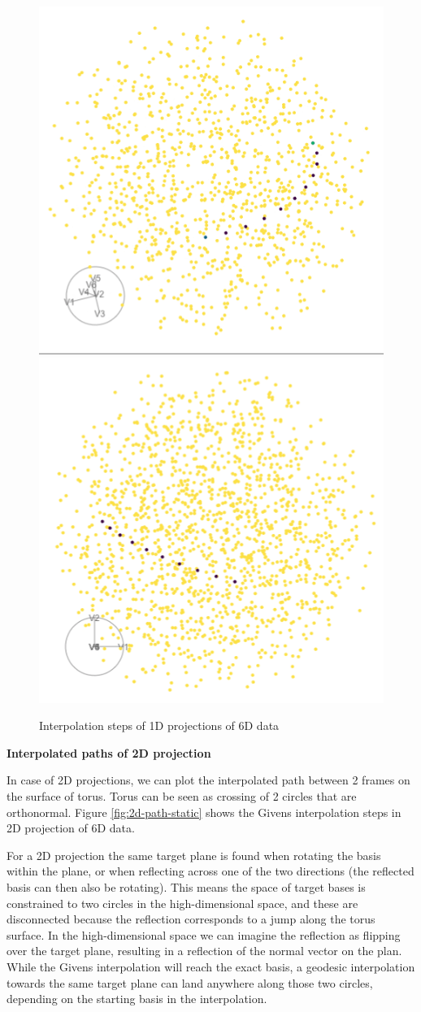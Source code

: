 \begin{Schunk}
\begin{figure}

{\centering \includegraphics[width=0.5\linewidth]{sphere_static} \includegraphics[width=0.5\linewidth]{torus_static} 

}

\caption[Interpolation steps of 1D projections of 6D data]{Interpolation steps of 1D projections of 6D data}\label{fig:1d-path-static}
\end{figure}
\end{Schunk}

\textbf{Interpolated paths of 2D projection}

In case of 2D projections, we can plot the interpolated path between 2
frames on the surface of torus. Torus can be seen as crossing of 2
circles that are orthonormal. Figure \ref{fig:2d-path-static} shows the
Givens interpolation steps in 2D projection of 6D data.

For a 2D projection the same target plane is found when rotating the
basis within the plane, or when reflecting across one of the two
directions (the reflected basis can then also be rotating). This means
the space of target bases is constrained to two circles in the
high-dimensional space, and these are disconnected because the
reflection corresponds to a jump along the torus surface. In the
high-dimensional space we can imagine the reflection as flipping over
the target plane, resulting in a reflection of the normal vector on the
plan. While the Givens interpolation will reach the exact basis, a
geodesic interpolation towards the same target plane can land anywhere
along those two circles, depending on the starting basis in the
interpolation.

